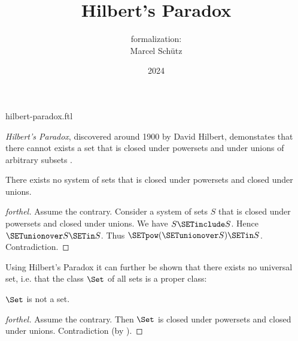 \documentclass{article}
\title{Hilbert's Paradox}
\author{\Naproche formalization:\\[0.5em]Marcel Schütz}
\date{2024}
\begin{document}
\begin{smodule}{hilbert-paradox.ftl}
\maketitle


\noindent \emph{Hilbert's Paradox}, discovered around 1900 by David Hilbert, 
demonstates that there cannot exists a set that is closed under powersets and 
under unions of arbitrary subsets \cite{PeckhausKahl2002}.

\begin{theorem}[forthel,title=Hilbert's Paradox,id=hilbert_paradox]
  There exists no system of sets that is closed under powersets and closed under unions.
\end{theorem}
\begin{proof}[forthel]
  Assume the contrary.
  Consider a system of sets $S$ that is closed under powersets and closed under unions.
  We have $S \SETinclude S$.
  Hence $\SETunionover S \SETin S$.
  Thus $\SETpow(\SETunionover S) \SETin S$.
  Contradiction.
\end{proof}

\noindent Using Hilbert's Paradox it can further be shown that there exists 
no universal set, i.e. that the class $\Set$ of all sets is a proper class:

\begin{proposition}[forthel,id=hilbert_paradox_corollary]
  $\Set$ is not a set.
\end{proposition}
\begin{proof}[forthel]
  Assume the contrary.
  Then $\Set$ is closed under powersets and closed under unions.
  Contradiction (by ).
\end{proof}

\printbibliography
{}
\end{smodule}
\end{document}
